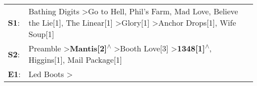 \begin{supertabular}{p{0.03\textwidth}p{0.92\textwidth}}
 \textbf{S1}:  &  Bathing Digits\textsuperscript{} \textgreater \enspace Go to Hell\textsuperscript{}, \enspace Phil's Farm\textsuperscript{}, \enspace Mad Love\textsuperscript{}, \enspace Believe the Lie[1]\textsuperscript{}, \enspace The Linear[1]\textsuperscript{} \textgreater \enspace Glory[1]\textsuperscript{} \textgreater \enspace Anchor Drops[1]\textsuperscript{}, \enspace Wife Soup[1]\textsuperscript{}  \enspace  \\
 \textbf{S2}:  &                                                                                                      Preamble\textsuperscript{} \textgreater \enspace \textbf{Mantis[2]\textsuperscript{$\wedge$}} \textgreater \enspace Booth Love[3]\textsuperscript{} \textgreater \enspace \textbf{1348[1]\textsuperscript{$\wedge$}}, \enspace Higgins[1]\textsuperscript{}, \enspace Mail Package[1]\textsuperscript{}  \enspace  \\
 \textbf{E1}:  &                                                                                                                                                                                                                                                                                                                                     Led Boots\textsuperscript{} \textgreater {}\textsuperscript{}  \enspace  \\
\end{supertabular}
